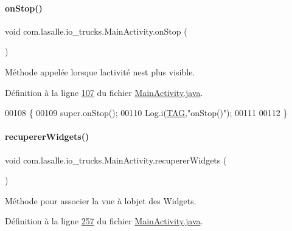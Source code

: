 \paragraph{\texorpdfstring{on\+Stop()}{onStop()}}
{\footnotesize\ttfamily void com.\+lasalle.\+io\+\_\+trucks.\+Main\+Activity.\+on\+Stop (\begin{DoxyParamCaption}{ }\end{DoxyParamCaption})\hspace{0.3cm}{\ttfamily [protected]}}



Méthode appelée lorsque l\textquotesingle{}activité n\textquotesingle{}est plus visible. 



Définition à la ligne \hyperlink{_main_activity_8java_source_l00107}{107} du fichier \hyperlink{_main_activity_8java_source}{Main\+Activity.\+java}.


\begin{DoxyCode}
00108     \{
00109         super.onStop();
00110         Log.i(\hyperlink{classcom_1_1lasalle_1_1io__trucks_1_1_main_activity_a37b90dba972711328e3f4c83c55eb0fc}{TAG},\textcolor{stringliteral}{"onStop()"});
00111 
00112     \}
\end{DoxyCode}
\mbox{\label{classcom_1_1lasalle_1_1io__trucks_1_1_main_activity_a36109f04e626f0bf4c1a73da14c4fb2b}} 
\paragraph{\texorpdfstring{recuperer\+Widgets()}{recupererWidgets()}}
{\footnotesize\ttfamily void com.\+lasalle.\+io\+\_\+trucks.\+Main\+Activity.\+recuperer\+Widgets (\begin{DoxyParamCaption}{ }\end{DoxyParamCaption})\hspace{0.3cm}{\ttfamily [private]}}



Méthode pour associer la vue à l\textquotesingle{}objet des Widgets. 



Définition à la ligne \hyperlink{_main_activity_8java_source_l00257}{257} du fichier \hyperlink{_main_activity_8java_source}{Main\+Activity.\+java}.



